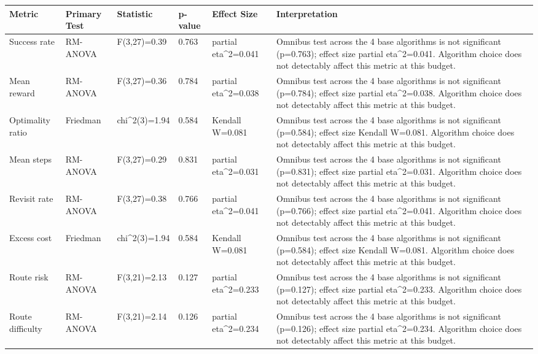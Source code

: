 \begin{tabular}{llllll}
\toprule
Metric & Primary Test & Statistic & p-value & Effect Size & Interpretation \\
\midrule
Success rate & RM-ANOVA & F(3,27)=0.39 & 0.763 & partial eta\textasciicircum 2=0.041 & Omnibus test across the 4 base algorithms is not significant (p=0.763); effect size partial eta\textasciicircum 2=0.041. Algorithm choice does not detectably affect this metric at this budget. \\
Mean reward & RM-ANOVA & F(3,27)=0.36 & 0.784 & partial eta\textasciicircum 2=0.038 & Omnibus test across the 4 base algorithms is not significant (p=0.784); effect size partial eta\textasciicircum 2=0.038. Algorithm choice does not detectably affect this metric at this budget. \\
Optimality ratio & Friedman & chi\textasciicircum 2(3)=1.94 & 0.584 & Kendall W=0.081 & Omnibus test across the 4 base algorithms is not significant (p=0.584); effect size Kendall W=0.081. Algorithm choice does not detectably affect this metric at this budget. \\
Mean steps & RM-ANOVA & F(3,27)=0.29 & 0.831 & partial eta\textasciicircum 2=0.031 & Omnibus test across the 4 base algorithms is not significant (p=0.831); effect size partial eta\textasciicircum 2=0.031. Algorithm choice does not detectably affect this metric at this budget. \\
Revisit rate & RM-ANOVA & F(3,27)=0.38 & 0.766 & partial eta\textasciicircum 2=0.041 & Omnibus test across the 4 base algorithms is not significant (p=0.766); effect size partial eta\textasciicircum 2=0.041. Algorithm choice does not detectably affect this metric at this budget. \\
Excess cost & Friedman & chi\textasciicircum 2(3)=1.94 & 0.584 & Kendall W=0.081 & Omnibus test across the 4 base algorithms is not significant (p=0.584); effect size Kendall W=0.081. Algorithm choice does not detectably affect this metric at this budget. \\
Route risk & RM-ANOVA & F(3,21)=2.13 & 0.127 & partial eta\textasciicircum 2=0.233 & Omnibus test across the 4 base algorithms is not significant (p=0.127); effect size partial eta\textasciicircum 2=0.233. Algorithm choice does not detectably affect this metric at this budget. \\
Route difficulty & RM-ANOVA & F(3,21)=2.14 & 0.126 & partial eta\textasciicircum 2=0.234 & Omnibus test across the 4 base algorithms is not significant (p=0.126); effect size partial eta\textasciicircum 2=0.234. Algorithm choice does not detectably affect this metric at this budget. \\
\bottomrule
\end{tabular}
